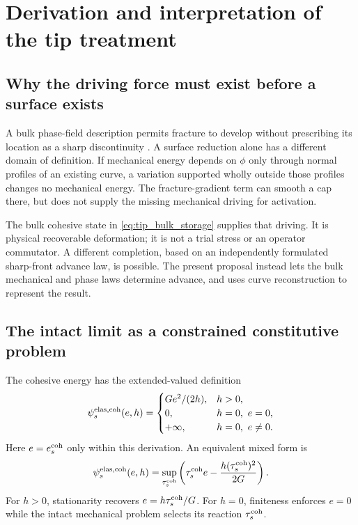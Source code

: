 \documentclass[10pt,a4paper]{article}
\begin{document}
\appendix
{}
\section{Derivation and interpretation of the tip treatment}

\subsection{Why the driving force must exist before a surface exists}

A bulk phase-field description permits fracture to develop without prescribing
its location as a sharp discontinuity \citep{Bourdin2000Variational}.
A surface reduction alone has a different domain of definition. If mechanical
energy depends on $\phi$ only through normal profiles of an existing curve,
a variation supported wholly outside those profiles changes no mechanical
energy. The fracture-gradient term can smooth a cap there, but does not supply
the missing mechanical driving for activation.

The bulk cohesive state in \eqref{eq:tip_bulk_storage} supplies that driving.
It is physical recoverable deformation; it is not a trial stress or an
operator commutator. A different completion, based on an independently
formulated sharp-front advance law, is possible. The present proposal instead
lets the bulk mechanical and phase laws determine advance, and uses curve
reconstruction to represent the result.

\subsection{The intact limit as a constrained constitutive problem}
\label{app:tip_intact}

The cohesive energy has the extended-valued definition
\begin{equation}
 \psi_s^{\rm elas,coh}(e,h)=
 \begin{cases}
 G e^2/(2h),&h>0,\\
 0,&h=0,\ e=0,\\
 +\infty,&h=0,\ e\ne0.
 \end{cases}
 \label{eq:tip_perspective}
\end{equation}
Here $e=e_s^{\rm coh}$ only within this derivation.
An equivalent mixed form is
\begin{equation}
 \psi_s^{\rm elas,coh}(e,h)
 =\sup_{\tau_s^{\rm coh}}
    \left(\tau_s^{\rm coh}e
          -\frac{h(\tau_s^{\rm coh})^2}{2G}\right).
 \label{eq:tip_mixed}
\end{equation}
For $h>0$, stationarity recovers $e=h\tau_s^{\rm coh}/G$.
For $h=0$, finiteness enforces $e=0$ while the intact mechanical problem
selects its reaction $\tau_s^{\rm coh}$.
\end{document}
